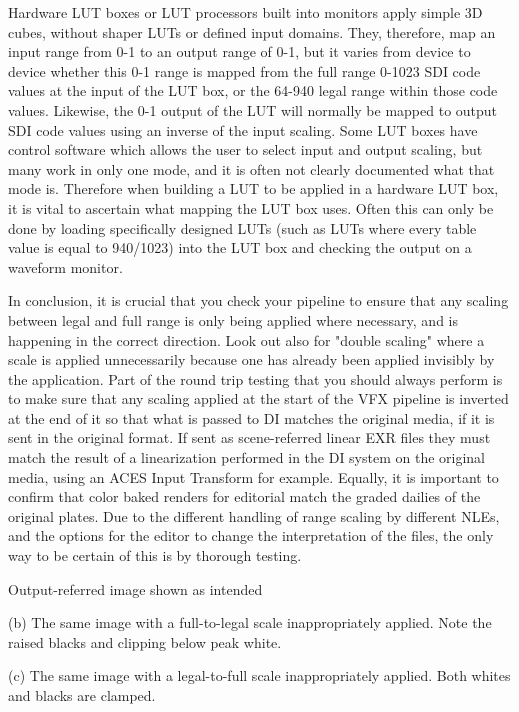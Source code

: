 Hardware LUT boxes or LUT processors built into monitors apply simple 3D cubes, without shaper LUTs or defined input domains. They, therefore, map an input range from 0-1 to an output range of 0-1, but it varies from device to device whether this 0-1 range is mapped from the full range 0-1023 SDI code values at the input of the LUT box, or the 64-940 legal range within those code values. Likewise, the 0-1 output of the LUT will normally be mapped to output SDI code values using an inverse of the input scaling. Some LUT boxes have control software which allows the user to select input and output scaling, but many work in only one mode, and it is often not clearly documented what that mode is. Therefore when building a LUT to be applied in a hardware LUT box, it is vital to ascertain what mapping the LUT box uses. Often this can only be done by loading specifically designed LUTs (such as LUTs where every table value is equal to 940/1023) into the LUT box and checking the output on a waveform monitor.

In conclusion, it is crucial that you check your pipeline to ensure that any scaling between legal and full range is only being applied where necessary, and is happening in the correct direction. Look out also for "double scaling" where a scale is applied unnecessarily because one has already been applied invisibly by the application. Part of the round trip testing that you should always perform is to make sure that any scaling applied at the start of the VFX pipeline is inverted at the end of it so that what is passed to DI matches the original media, if it is sent in the original format. If sent as scene-referred linear EXR files they must match the result of a linearization performed in the DI system on the original media, using an ACES Input Transform for example. Equally, it is important to confirm that color baked renders for editorial match the graded dailies of the original plates. Due to the different handling of range scaling by different NLEs, and the options for the editor to change the interpretation of the files, the only way to be certain of this is by thorough testing.


Output-referred image shown as intended

(b) The same image with a full-to-legal scale inappropriately applied. Note the raised blacks and clipping below peak white.


(c) The same image with a legal-to-full scale inappropriately applied. Both whites and blacks are clamped.

